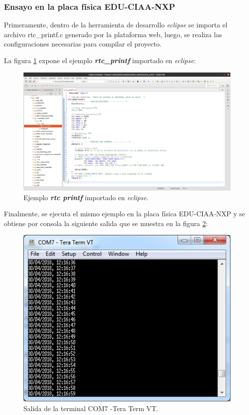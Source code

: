 \subsubsection{Ensayo en la placa física EDU-CIAA-NXP} 

Primeramente, dentro de la herramienta de desarrollo \textit{eclipse} se importa el archivo \textquotedbl rtc\_printf.c\textquotedbl{} generado por la plataforma web, luego, se realiza las configuraciones necesarias para compilar el proyecto. 

La figura \ref{fig:rtcprintfEclipse} expone el ejemplo \textit{\textbf{rtc\_printf}} importado en \textit{eclipse}: 

\begin{figure}[ht]
	\centering
	\includegraphics[scale=.20]{./Figures/rtcprintfEclipse.png}
	\caption{Ejemplo \textit{\textbf{rtc printf}} importado en \textit{eclipse}.}
	\label{fig:rtcprintfEclipse}
\end{figure}

\hfill \break

Finalmente, se ejecuta el mismo ejemplo en la placa física EDU-CIAA-NXP y se obtiene por consola la siguiente salida que se muestra en la figura \ref{fig:rtcprintfPlaca}:

\begin{figure}[ht]
	\centering
	\includegraphics[scale=.90]{./Figures/rtcprintfPlaca.png}
	\caption{Salida de la terminal COM7 -Tera Term VT.}
	\label{fig:rtcprintfPlaca}
\end{figure}

